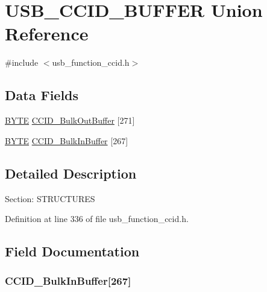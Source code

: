 \hypertarget{union_u_s_b___c_c_i_d___b_u_f_f_e_r}{}\section{U\+S\+B\+\_\+\+C\+C\+I\+D\+\_\+\+B\+U\+F\+F\+E\+R Union Reference}
\label{union_u_s_b___c_c_i_d___b_u_f_f_e_r}


{\ttfamily \#include $<$usb\+\_\+function\+\_\+ccid.\+h$>$}

\subsection*{Data Fields}
\begin{DoxyCompactItemize}
\item 
\hyperlink{_generic_type_defs_8h_a4ae1dab0fb4b072a66584546209e7d58}{B\+Y\+T\+E} \hyperlink{union_u_s_b___c_c_i_d___b_u_f_f_e_r_a5a919bd320cab81f68ecb7808b24228a}{C\+C\+I\+D\+\_\+\+Bulk\+Out\+Buffer} \mbox{[}271\mbox{]}
\item 
\hyperlink{_generic_type_defs_8h_a4ae1dab0fb4b072a66584546209e7d58}{B\+Y\+T\+E} \hyperlink{union_u_s_b___c_c_i_d___b_u_f_f_e_r_a3f05a0629ad43a87c9099b054869269d}{C\+C\+I\+D\+\_\+\+Bulk\+In\+Buffer} \mbox{[}267\mbox{]}
\end{DoxyCompactItemize}


\subsection{Detailed Description}
Section\+: S\+T\+R\+U\+C\+T\+U\+R\+E\+S 

Definition at line 336 of file usb\+\_\+function\+\_\+ccid.\+h.



\subsection{Field Documentation}
\hypertarget{union_u_s_b___c_c_i_d___b_u_f_f_e_r_a3f05a0629ad43a87c9099b054869269d}{}
\subsubsection[{C\+C\+I\+D\+\_\+\+Bulk\+In\+Buffer}]{ C\+C\+I\+D\+\_\+\+Bulk\+In\+Buffer\mbox{[}267\mbox{]}}\label{union_u_s_b___c_c_i_d___b_u_f_f_e_r_a3f05a0629ad43a87c9099b054869269d}


